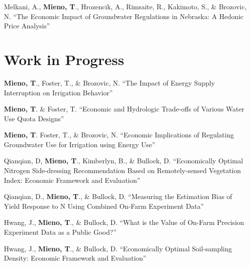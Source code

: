 \documentclass[10pt,margin,line]{res}
\newenvironment{list1}{
  \begin{list}{\ding{113}}{%
      \setlength{\itemsep}{0in}
      \setlength{\parsep}{0in} \setlength{\parskip}{0in}
      \setlength{\topsep}{0in} \setlength{\partopsep}{0in}
      \setlength{\leftmargin}{0.17in}}}{\end{list}}
\begin{document}
\begin{resume}
\begin{list1}
\item[] Melkani, A., \textbf{Mieno, T}., Hrozencik, A., Rimsaite, R., Kakimoto, S., \& Brozovic, N. ``The Economic Impact of Groundwater Regulations in Nebraska: A Hedonic Price Analysis''
\vspace*{0.3cm}

\end{list1}

\section{\sc Work in Progress}
\begin{list1}

\item[] \textbf{Mieno, T}., Foster, T., \& Brozovic, N. ``The Impact of Energy Supply Interruption on Irrigation Behavior''
\vspace*{0.3cm}

\item[] \textbf{Mieno, T}. \& Foster, T. ``Economic and Hydrologic Trade-offs of Various Water Use Quota Designs''
\vspace*{0.3cm}

\item[] \textbf{Mieno, T}. Foster, T., \& Brozovic, N. ``Economic Implications of Regulating Groundwater Use for Irrigation using Energy Use''
\vspace*{0.3cm}

\item[] Qianqian, D, \textbf{Mieno, T}., Kimberlyn, B., \& Bullock, D. ``Economically Optimal Nitrogen Side-dressing Recommendation Based on Remotely-sensed Vegetation Index: Economic Framework and Evaluation''
\vspace*{0.3cm}

\item[] Qianqian, D., \textbf{Mieno, T}., \& Bullock, D. ``Measuring the Estimation Bias of Yield Response to N Using Combined On-Farm Experiment Data''
\vspace*{0.3cm}

\item[] Hwang, J., \textbf{Mieno, T}., \& Bullock, D. ``What is the Value of On-Farm Precision Experiment Data as a Public Good?''
\vspace*{0.3cm}

\item[] Hwang, J., \textbf{Mieno, T}., \& Bullock, D. ``Economically Optimal Soil-sampling Density: Economic Framework and Evaluation''
\vspace*{0.3cm}


\end{list1}
\end{resume}
\end{document}
